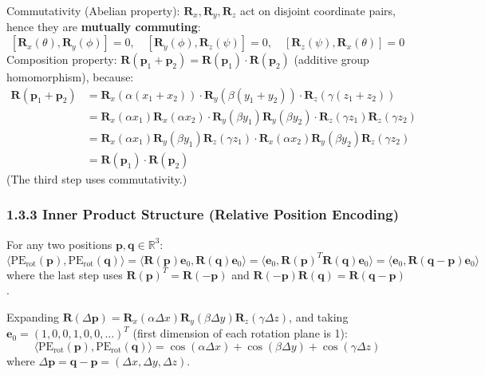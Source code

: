 \documentclass[
  12pt,
]{article}
\begin{document}
Commutativity (Abelian property): $\mathbf{R}_x, \mathbf{R}_y, \mathbf{R}_z$ act on disjoint coordinate pairs, hence they are \textbf{mutually commuting}:
\[[\mathbf{R}_x(\theta), \mathbf{R}_y(\phi)] = 0, \quad [\mathbf{R}_y(\phi), \mathbf{R}_z(\psi)] = 0, \quad [\mathbf{R}_z(\psi), \mathbf{R}_x(\theta)] = 0\]
Composition property: $\mathbf{R}(\mathbf{p}_1 + \mathbf{p}_2) = \mathbf{R}(\mathbf{p}_1) \cdot \mathbf{R}(\mathbf{p}_2)$ (additive group homomorphism), because:
\begin{align*}
\mathbf{R}(\mathbf{p}_1 + \mathbf{p}_2) &= \mathbf{R}_x(\alpha(x_1 + x_2)) \cdot \mathbf{R}_y(\beta(y_1 + y_2)) \cdot \mathbf{R}_z(\gamma(z_1 + z_2)) \\
&= \mathbf{R}_x(\alpha x_1)\mathbf{R}_x(\alpha x_2) \cdot \mathbf{R}_y(\beta y_1)\mathbf{R}_y(\beta y_2) \cdot \mathbf{R}_z(\gamma z_1)\mathbf{R}_z(\gamma z_2) \\
&= \mathbf{R}_x(\alpha x_1)\mathbf{R}_y(\beta y_1)\mathbf{R}_z(\gamma z_1) \cdot \mathbf{R}_x(\alpha x_2)\mathbf{R}_y(\beta y_2)\mathbf{R}_z(\gamma z_2) \\
&= \mathbf{R}(\mathbf{p}_1) \cdot \mathbf{R}(\mathbf{p}_2)
\end{align*}
(The third step uses commutativity.)

\subsubsection{1.3.3 Inner Product Structure (Relative Position Encoding)}\label{inner-product-structure}

For any two positions $\mathbf{p}, \mathbf{q} \in \mathbb{R}^3$:
\[\boxed{\langle \text{PE}_{\text{rot}}(\mathbf{p}), \text{PE}_{\text{rot}}(\mathbf{q}) \rangle = \langle \mathbf{R}(\mathbf{p})\mathbf{e}_0, \mathbf{R}(\mathbf{q})\mathbf{e}_0 \rangle = \langle \mathbf{e}_0, \mathbf{R}(\mathbf{p})^T \mathbf{R}(\mathbf{q}) \mathbf{e}_0 \rangle = \langle \mathbf{e}_0, \mathbf{R}(\mathbf{q} - \mathbf{p}) \mathbf{e}_0 \rangle}\]
where the last step uses $\mathbf{R}(\mathbf{p})^T = \mathbf{R}(-\mathbf{p})$ and $\mathbf{R}(-\mathbf{p})\mathbf{R}(\mathbf{q}) = \mathbf{R}(\mathbf{q} - \mathbf{p})$.

Expanding $\mathbf{R}(\Delta\mathbf{p}) = \mathbf{R}_x(\alpha\Delta x)\mathbf{R}_y(\beta\Delta y)\mathbf{R}_z(\gamma\Delta z)$, and taking $\mathbf{e}_0 = (1, 0, 0, 1, 0, 0, \ldots)^T$ (first dimension of each rotation plane is 1):
\[\langle \text{PE}_{\text{rot}}(\mathbf{p}), \text{PE}_{\text{rot}}(\mathbf{q}) \rangle = \cos(\alpha\Delta x) + \cos(\beta\Delta y) + \cos(\gamma\Delta z)\]
where $\Delta\mathbf{p} = \mathbf{q} - \mathbf{p} = (\Delta x, \Delta y, \Delta z)$.
\end{document}
